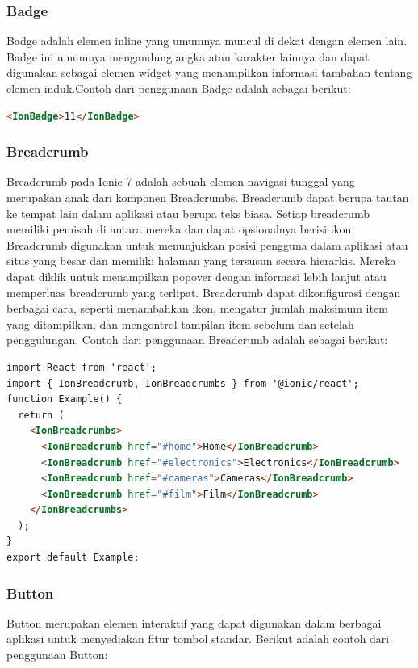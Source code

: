\subsubsection{Badge}
Badge adalah elemen inline yang umumnya muncul di dekat dengan elemen lain. Badge ini umumnya mengandung angka atau karakter lainnya dan dapat digunakan sebagai elemen widget yang menampilkan informasi tambahan tentang elemen induk.Contoh dari penggunaan Badge adalah sebagai berikut:

\begin{lstlisting}[language=HTML, caption=Contoh kode untuk membuat Badge, label=kode:ion-badge]
<IonBadge>11</IonBadge>
\end{lstlisting}

\subsubsection{Breadcrumb}
Breadcrumb pada Ionic 7 adalah sebuah elemen navigasi tunggal yang merupakan anak dari komponen Breadcrumbs. Breadcrumb dapat berupa tautan ke tempat lain dalam aplikasi atau berupa teks biasa. Setiap breadcrumb memiliki pemisah di antara mereka dan dapat opsionalnya berisi ikon. Breadcrumb digunakan untuk menunjukkan posisi pengguna dalam aplikasi atau situs yang besar dan memiliki halaman yang tersusun secara hierarkis. Mereka dapat diklik untuk menampilkan popover dengan informasi lebih lanjut atau memperluas breadcrumb yang terlipat. Breadcrumb dapat dikonfigurasi dengan berbagai cara, seperti menambahkan ikon, mengatur jumlah maksimum item yang ditampilkan, dan mengontrol tampilan item sebelum dan setelah penggulungan. Contoh dari penggunaan Breadcrumb adalah sebagai berikut:

\begin{lstlisting}[language=HTML, caption=Contoh kode untuk membuat Breadcrumb, label=kode:ion-breadcrumb]
import React from 'react';
import { IonBreadcrumb, IonBreadcrumbs } from '@ionic/react';
function Example() {
  return (
    <IonBreadcrumbs>
      <IonBreadcrumb href="#home">Home</IonBreadcrumb>
      <IonBreadcrumb href="#electronics">Electronics</IonBreadcrumb>
      <IonBreadcrumb href="#cameras">Cameras</IonBreadcrumb>
      <IonBreadcrumb href="#film">Film</IonBreadcrumb>
    </IonBreadcrumbs>
  );
}
export default Example;
\end{lstlisting}

\subsubsection{Button}
Button merupakan elemen interaktif yang dapat digunakan dalam berbagai aplikasi untuk menyediakan fitur tombol standar. Berikut adalah contoh dari penggunaan Button:

